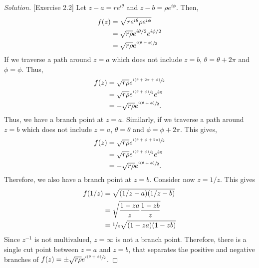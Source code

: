 \documentclass[11pt,letterpaper]{article}
\newenvironment{solution}
{\renewcommand\qedsymbol{}\begin{proof}[Solution]}
	{\end{proof}\bigskip}
\begin{document}
	\begin{solution}[Exercise 2.2]
		Let $z - a = re^{i\theta}$ and $z-b = \rho e^{i\phi}$. Then,
		\[\begin{split}
			f(z) &= \sqrt{re^{i\theta}\rho e^{i\phi}}\\
			&=\sqrt{r\rho}e^{i\theta /2} e^{i\phi /2}\\
			&= \sqrt{r\rho} e^{\sfrac{i(\theta + \phi)}{2}}
		\end{split}\]
		If we traverse a path around $z = a$ which does not include $z = b$, $\theta = \theta +2\pi$ and $\phi = \phi$. Thus,
		\[\begin{split}
			f(z) &= \sqrt{r\rho} e^{\sfrac{i(\theta + 2\pi + \phi)}{2}}\\
			&= \sqrt{r\rho} e^{\sfrac{i(\theta + \phi)}{2}}e^{i\pi}\\
			&= -\sqrt{r\rho} e^{\sfrac{i(\theta + \phi)}{2}}.
		\end{split}\]
		Thus, we have a branch point at $z = a$. Similarly, if  we traverse a path around $z = b$ which does not include $z = a$, $\theta = \theta $ and $\phi = \phi +2\pi$. This gives,
		\[\begin{split}
			f(z) &= \sqrt{r\rho} e^{\sfrac{i(\theta + \phi + 2\pi)}{2}}\\
			&= \sqrt{r\rho} e^{\sfrac{i(\theta + \phi)}{2}}e^{i\pi}\\
			&= -\sqrt{r\rho} e^{\sfrac{i(\theta + \phi)}{2}}.
		\end{split}\]
		Therefore, we also have a branch point at $z = b$. Consider now $z = 1/z$. This gives
		\[\begin{split}
			f(1/z) &= \sqrt{(1/z -a)(1/z-b)}\\
			&=\sqrt{\frac{1-za}{z}\frac{1-zb}{z}}\\
			&=\sfrac{1}{z}\sqrt{(1-za)(1-zb)}
		\end{split}\]
		Since $z^{-1}$ is not multivalued, $z = \infty$ is not a branch point. Therefore, there is a single cut point between $z = a$ and $z = b$, that separates the positive and negative branches of $f(z) = \pm \sqrt{r\rho} e^{\sfrac{i(\theta + \phi)}{2}}$.
		

\end{solution}
\end{document}
